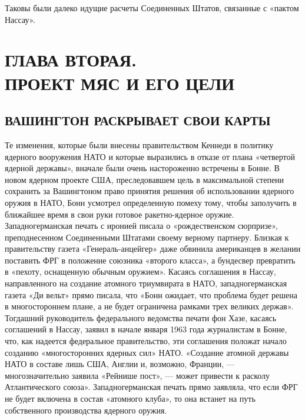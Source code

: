\documentclass[12pt, a4paper, openany]{book}
\begin{document}
	Таковы были далеко идущие расчеты Соединенных Штатов, связанные с «пактом Нассау».
	
	
		\newpage
		\section[Глава вторая. ПРОЕКТ МЯС И ЕГО ЦЕЛИ]{\center ГЛАВА ВТОРАЯ.\\ \textbf{ПРОЕКТ МЯС И ЕГО ЦЕЛИ}}	
	\subsection[Вашингтон раскрывает свои карты]{\center ВАШИНГТОН РАСКРЫВАЕТ СВОИ КАРТЫ}
	

Те изменения, которые были внесены правительством Кеннеди в политику ядерного вооружения НАТО и которые выразились в отказе от плана «четвертой ядерной державы», вначале были очень настороженно встречены в Бонне. В новом ядерном проекте США, преследовавшем цель в максимальной степени сохранить за Вашингтоном право принятия решения об использовании ядерного оружия в НАТО, Бонн усмотрел определенную помеху тому, чтобы заполучить в ближайшее время в свои руки готовое ракетно-ядерное оружие. Западногерманская печать с иронией писала о «рождественском сюрпризе», преподнесенном Соединенными Штатами своему верному партнеру. Близкая к правительству газета «Генераль-анцейгер» даже обвинила американцев в желании поставить ФРГ в положение союзника «второго класса», а бундесвер превратить в «пехоту, оснащенную обычным оружием». Касаясь соглашения в Нассау, направленного на создание атомного триумвирата в НАТО, западногерманская газета «Ди вельт» прямо писала, что «Бонн ожидает, что проблема будет решена в многостороннем плане, а не будет ограничена рамками трех великих держав». Тогдашний руководитель федерального ведомства печати фон Хазе, касаясь соглашений в Нассау, заявил в начале января 1963 года журналистам в Бонне, что, как надеется федеральное правительство, эти соглашения положат начало созданию «многосторонних ядерных сил» НАТО. «Создание атомной державы НАТО в составе лишь США, Англии и, возможно, Франции, — многозначительно заявила «Рейнише пост», — может привести к расколу Атлантического союза». Западногерманская печать прямо заявляла, что если ФРГ не будет включена в состав «атомного клуба», то она встанет на путь собственного производства ядерного оружия.
\end{document}

